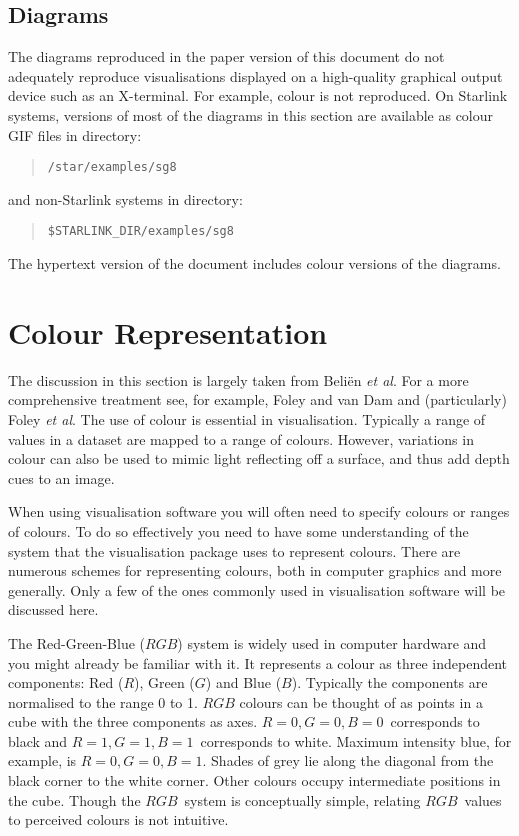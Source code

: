 \documentclass[twoside,11pt]{article}
\newcommand{\htmladdnormallink}[2]{#1}
\newcommand{\xlabel}[1]{}
\begin{document}
\subsection{Diagrams}

The diagrams reproduced in the paper version of this document do not
adequately reproduce visualisations displayed on a high-quality
graphical output device such as an X-terminal. For example, colour
is not reproduced. On Starlink systems, versions of most of the
diagrams in this section are available as colour GIF files in directory:

\begin{quote}
{\tt /star/examples/sg8}
\end{quote}

and non-Starlink systems in directory:
\begin{quote}
{\tt \$STARLINK\_DIR/examples/sg8}
\end{quote}

The hypertext version of the document includes colour versions of the
diagrams.


\section{Colour Representation \label{COLREP} \xlabel{COLREP} }

The discussion in this section is largely taken from
\htmladdnormallink{Beli\"{e}n {\it et al}}
{http://www.sara.nl/Rik/REPORT.update}\cite{BELIEN}. For a more
comprehensive treatment see, for example, Foley and van Dam\cite{FOLEY1}
and (particularly) Foley {\it et al}\cite{FOLEY2}. The use of colour is
essential in visualisation. Typically a range of values in a dataset are
mapped to a range of colours. However, variations in colour can also be
used to mimic light reflecting off a surface, and thus add depth cues to
an image.

When using visualisation software you will often need to specify colours
or ranges of colours. To do so effectively you need to have some
understanding of the system that the visualisation package uses to
represent colours. There are numerous schemes for representing colours,
both in computer graphics and more generally. Only a few of the ones
commonly used in visualisation software will be discussed here.

The Red-Green-Blue ($RGB$) system is widely used in computer hardware
and you might already be familiar with it. It represents a colour
as three independent components: Red ($R$), Green ($G$) and Blue ($B$).
Typically the components are normalised to the range 0 to 1. $RGB$
colours can be thought of as points in a cube with the three components
as axes. $R=0, G=0, B=0$\, corresponds to black and $R=1, G=1, B=1$\,
corresponds to white. Maximum intensity blue, for example, is $R=0, G=0,
B=1$. Shades of grey lie along the diagonal from the black corner to the
white corner. Other colours occupy intermediate positions in the cube.
Though the $RGB$\, system is conceptually simple, relating $RGB$\,
values to perceived colours is not intuitive.
\end{document}
